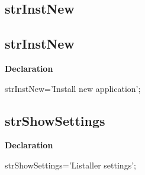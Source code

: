 \documentclass{report}
\newif\ifpdf
\begin{document}
\subsection*{\large{\textbf{strInstNew}}\normalsize\hspace{1ex}\hrulefill}
\else
\subsection*{strInstNew}
\fi
\label{trstrings-strInstNew}
\begin{list}{}{
\setlength{\itemindent}{0cm}
\setlength{\listparindent}{0cm}
\setlength{\leftmargin}{\evensidemargin}
\addtolength{\leftmargin}{\tmplength}
\settowidth{\labelsep}{X}
\addtolength{\leftmargin}{\labelsep}
\setlength{\labelwidth}{\tmplength}
}
\item[\textbf{Declaration}\hfill]
\ifpdf
\begin{flushleft}
\fi
\begin{ttfamily}
strInstNew='Install new application';\end{ttfamily}

\ifpdf
\end{flushleft}
\fi

\end{list}
\ifpdf
\subsection*{\large{\textbf{strShowSettings}}\normalsize\hspace{1ex}\hrulefill}
\else
\subsection*{strShowSettings}
\fi
\label{trstrings-strShowSettings}
\begin{list}{}{
\setlength{\itemindent}{0cm}
\setlength{\listparindent}{0cm}
\setlength{\leftmargin}{\evensidemargin}
\addtolength{\leftmargin}{\tmplength}
\settowidth{\labelsep}{X}
\addtolength{\leftmargin}{\labelsep}
\setlength{\labelwidth}{\tmplength}
}
\item[\textbf{Declaration}\hfill]
\ifpdf
\begin{flushleft}
\fi
\begin{ttfamily}
strShowSettings='Listaller settings';\end{ttfamily}

\ifpdf
\end{flushleft}
\fi

\end{list}
\ifpdf
\end{document}
